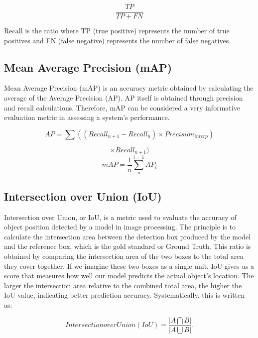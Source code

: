 \begin{equation}
    \frac{TP}{TP+FN}
\end{equation}

Recall is the ratio where TP (true positive) represents the number of true positives and FN (false negative) represents the number of false negatives.

\subsection*{Mean Average Precision (mAP)}
Mean Average Precision (mAP) is an accuracy metric obtained by calculating the average of the Average Precision (AP). AP itself is obtained through precision and recall calculations. Therefore, mAP can be considered a very informative evaluation metric in assessing a system's performance.

\begin{equation}
    AP=\sum ((Recall_{n+1}-Recall_{n})\times Precision_{interp})
\end{equation}

\begin{equation}
  \times Recall_{n+1})
\end{equation}
\begin{equation}
    mAP=\frac{1}{n}\sum_{n}^{i=1}AP_{i}
\end{equation}

\subsection{Intersection over Union (IoU)}
\label{subsec:intersectionoverunion}

Intersection over Union, or IoU, is a metric used to evaluate the accuracy of object position detected by a model in image processing. The principle is to calculate the intersection area between the detection box produced by the model and the reference box, which is the gold standard or Ground Truth. This ratio is obtained by comparing the intersection area of the two boxes to the total area they cover together. If we imagine these two boxes as a single unit, IoU gives us a score that measures how well our model predicts the actual object's location. The larger the intersection area relative to the combined total area, the higher the IoU value, indicating better prediction accuracy. Systematically, this is written as:

\begin{equation}
IntersectionoverUnion(IoU) = \frac{\left |A\bigcap B  \right |}{\left | A\bigcup B \right |}.
\end{equation}

